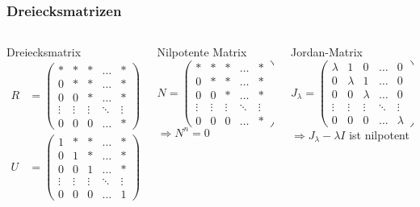 %
%
%
\begin{frame}[t]
\frametitle{Dreiecksmatrizen}
\begin{columns}[t,onlytextwidth]
\begin{column}{0.31\textwidth}
\begin{block}{Dreiecksmatrix}
\begin{align*}
R&=
\begin{pmatrix}
*&*&*&\dots&*\\
0&*&*&\dots&*\\
0&0&*&\dots&*\\
\vdots&\vdots&\vdots&\ddots&\vdots\\
0&0&0&\dots&*
\end{pmatrix}
\\
U&=
\begin{pmatrix}
1&*&*&\dots&*\\
0&1&*&\dots&*\\
0&0&1&\dots&*\\
\vdots&\vdots&\vdots&\ddots&\vdots\\
0&0&0&\dots&1
\end{pmatrix}
\end{align*}
\end{block}
\end{column}
\begin{column}{0.31\textwidth}
\begin{block}{Nilpotente Matrix}
\[
N=
\begin{pmatrix}
*&*&*&\dots&*\\
0&*&*&\dots&*\\
0&0&*&\dots&*\\
\vdots&\vdots&\vdots&\ddots&\vdots\\
0&0&0&\dots&*
\end{pmatrix}
\]
$\Rightarrow N^n=0$
\end{block}
\end{column}
\begin{column}{0.31\textwidth}
\begin{block}{Jordan-Matrix}
\[
J_\lambda=\begin{pmatrix}
\lambda&1&0&\dots&0\\
0&\lambda&1&\dots&0\\
0&0&\lambda&\dots&0\\
\vdots&\vdots&\vdots&\ddots&\vdots\\
0&0&0&\dots&\lambda
\end{pmatrix}
\]
$\Rightarrow J_\lambda -\lambda I$ ist nilpotent
\end{block}
\end{column}
\end{columns}
\end{frame}
